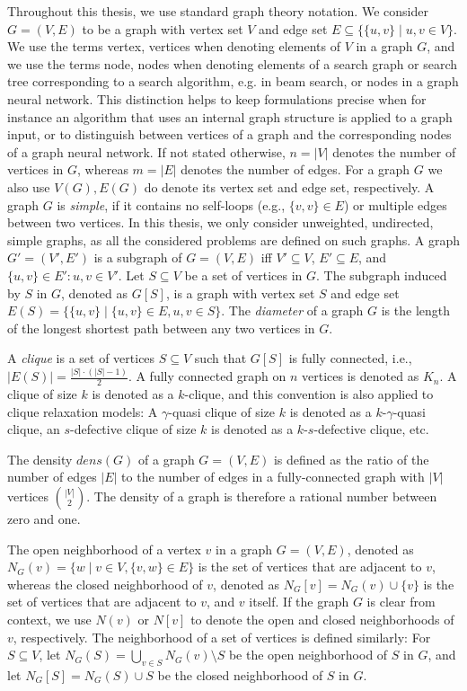 \documentclass[draft,final]{vutinfth} %
\begin{document}
Throughout this thesis, we use standard graph theory notation. 
We consider $G = (V, E)$ to be a graph with vertex set $V$ and edge set $E \subseteq \{\{u,v\} \mid u,v \in V\}$. We use the terms vertex, vertices when denoting elements of $V$ in a graph $G$, and we use the terms node, nodes when denoting elements of a search graph or search tree corresponding to a search algorithm, e.g. in beam search, or nodes in a graph neural network. This distinction helps to keep formulations precise when for instance an algorithm that uses an internal graph structure is applied to a graph input, or to distinguish between vertices of a graph and the corresponding nodes of a graph neural network. 
If not stated otherwise, $n = |V|$ denotes the number of vertices in $G$, whereas $m = |E|$ denotes the number of edges. 
For a graph $G$ we also use $V(G), E(G)$ do denote its vertex set and edge set, respectively. 
A graph $G$ is \emph{simple}, if it contains no self-loops (e.g.,  $\{v,v\} \in E$) or multiple edges between two vertices. In this thesis, we only consider unweighted, undirected, simple graphs, as all the considered problems are defined on such graphs. 
A graph $G' = (V', E')$ is a subgraph of $G = (V,E)$ iff $V' \subseteq V$, $E' \subseteq E$, and $\{u,v\} \in E' \colon u,v \in V'$. Let $S \subseteq V$ be a set of vertices in $G$. The subgraph induced by $S$ in $G$, denoted as $G[S]$, is a graph with vertex set $S$ and edge set $E(S) = \{ \{u,v\} \mid \{u,v\} \in E, u,v \in S \}$. 
The \emph{diameter} of a graph $G$ is the length of the longest shortest path between any two vertices in $G$. 

A \emph{clique} is a set of vertices $S \subseteq V$ such that $G[S]$ is fully connected, i.e., $|E(S)| = \frac{|S| \cdot (|S|-1)}{2}$. A fully connected graph on $n$ vertices is denoted as $K_n$. A clique of size $k$ is denoted as a $k$-clique, and this convention is also applied to clique relaxation models: A $\gamma$-quasi clique of size $k$ is denoted as a $k$-$\gamma$-quasi clique, an $s$-defective clique of size $k$ is denoted as a $k$-$s$-defective clique, etc. 

The density $\mathit{dens}(G)$ of a graph $G = (V,E)$ is defined as the ratio of the number of edges $|E|$ to the number of edges in a fully-connected graph with $|V|$ vertices $\binom{|V|}{2}$. 
The density of a graph is therefore a rational number between zero and one. 

The open neighborhood of a vertex $v$ in a graph $G = (V,E)$, denoted as $N_G(v) = \{ w \mid v \in V, \{v,w\} \in E\}$ is the set of vertices that are adjacent to $v$, whereas the closed neighborhood of $v$, denoted as $N_G[v] = N_G(v) \cup \{v\}$ is the set of vertices that are adjacent to $v$, and $v$ itself. 
If the graph $G$ is clear from context, we use $N(v)$ or $N[v]$ to denote the open and closed neighborhoods of $v$, respectively. 
The neighborhood of a set of vertices is defined similarly: For $S \subseteq V$, let $N_G(S) = \bigcup_{v \in S} N_G(v) \setminus S$ be the open neighborhood of $S$ in $G$, and let $N_G[S] = N_G(S) \cup S$ be the closed neighborhood of $S$ in $G$. 
\end{document}
